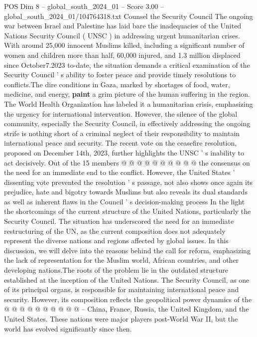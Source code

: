 \begin{textsample}{POS Dim 8 – global\_south\_2024\_01 – Score 3.00 – global\_south\_2024\_01/104764318.txt}  \label{ex:f8_pos_398}
Counsel the Security Council The ongoing war between Israel and Palestine has laid bare the inadequacies of the United Nations Security Council ( UNSC ) in addressing urgent humanitarian crises.
With around 25,000 innocent Muslims killed, including a significant number of women and children more than half, 60,000 injured, and 1.3 million displaced since October7.2023 to-date, the situation demands a critical examination of the Security Council ' s ability to foster peace and provide timely resolutions to conflicts.The dire conditions in Gaza, marked by shortages of food, water, medicine, and energy, \textbf{paint} a grim picture of the human suffering in the region.
The World Health Organization has labeled it a humanitarian crisis, emphasizing the urgency for international intervention.
However, the silence of the global community, especially the Security Council, in effectively addressing the ongoing strife is nothing short of a criminal neglect of their responsibility to maintain international peace and security.
The recent vote on the ceasefire resolution, proposed on December 14th, 2023, further highlights the UNSC ' s inability to act decisively.
Out of the 15 members @ @ @ @ @ @ @ @ @ @ the consensus on the need for an immediate end to the conflict.
However, the United States ' dissenting vote prevented the resolution ' s passage, not also shows once again its prejudice, hate and bigotry towards Muslims but also reveals its dual standards as well as inherent flaws in the Council ' s decision-making process In the light the shortcomings of the current structure of the United Nations, particularly the Security Council.
The situation has underscored the need for an immediate restructuring of the UN, as the current composition does not adequately represent the diverse nations and regions affected by global issues.
In this discussion, we will delve into the reasons behind the call for reform, emphasizing the lack of representation for the Muslim world, African countries, and other developing nations.The roots of the problem lie in the outdated structure established at the inception of the United Nations.
The Security Council, as one of its principal organs, is responsible for maintaining international peace and security.
However, its composition reflects the geopolitical power dynamics of the @ @ @ @ @ @ @ @ @ @ -- China, France, Russia, the United Kingdom, and the United States.
These nations were major players post-World War II, but the world has evolved significantly since then.

\end{textsample}
